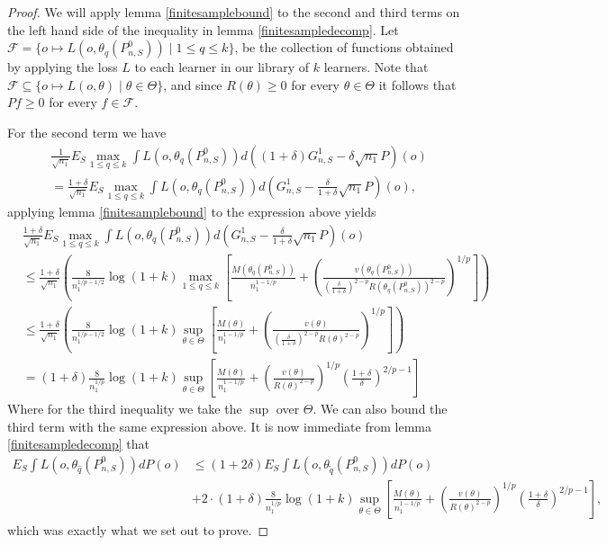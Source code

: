 \documentclass[11pt, a4paper]{article}
\theoremstyle{definition}
\theoremstyle{remark}
\newcommand{\q}{q}
\newcommand{\btheta}{\theta}
\begin{document}
\begin{proof}
    We will apply lemma \ref{finitesamplebound} to the second and third terms on the left hand side of the inequality in lemma \ref{finitesampledecomp}. Let $ \mathcal{F} = \{o \mapsto L(o, \btheta_{\q}(P_{n,S}^{0})) \mid 1 \leq \q \leq k\}$, be the collection of functions obtained by applying the loss $ L $ to each learner in our library of $ k $ learners. Note that $ \mathcal{F} \subseteq \{o \mapsto L(o, \btheta) \mid \btheta \in \Theta\} $, and since $ R(\btheta) \geq 0 $ for every $ \btheta \in \Theta $ it follows that $ Pf \geq 0 $ for every $ f \in \mathcal{F} $. 
   
For the second term we have 
\begin{align*}
&\frac{1}{\sqrt{n_1} } E_{S} \max_{1 \leq \q \leq k} \int L(o, \btheta_{\q}(P_{n, S}^{0})) d ((1 + \delta) G_{n,S}^{1} - \delta \sqrt{n_1} P)(o)\\
&= 
\frac{1 + \delta}{\sqrt{n_1} } E_{S} \max_{1 \leq \q \leq k} \int L(o, \btheta_{\q}(P_{n, S}^{0})) d (G_{n,S}^{1} - \frac{\delta }{1 + \delta} \sqrt{n_1} P)(o),
\end{align*}
applying lemma \ref{finitesamplebound} to the expression above yields 
\begin{align*}
&\frac{1 + \delta}{\sqrt{n_1} } E_{S} \max_{1 \leq \q \leq k} \int L(o, \btheta_{\q}(P_{n, S}^{0})) d (G_{n,S}^{1} - \frac{\delta }{1 + \delta} \sqrt{n_1} P)(o) \\
&\leq  \frac{1 + \delta}{\sqrt{n_1}}\left( \frac{8}{n_1^{1/p-1/2}} \log(1 + k) \max_{1 \leq \q \leq k} \left[ \frac{M(\btheta_{\q}(P_{n,S}^{0}))}{n_1^{1-1/p}} + \left( \frac{v(\btheta_{ \q}(P_{n,S}^0) )}{( \frac{\delta}{1 + \delta} )^{2-p} R(\btheta_{\q}(P_{n,S}^{0}))^{2-p}} \right)^{1/p} \right] \right)\\
&\leq  \frac{1 + \delta}{\sqrt{n_1}}\left( \frac{8}{n_1^{1/p-1/2}} \log(1 + k) \sup_{\btheta \in \Theta} \left[ \frac{M(\btheta)}{n_1^{1-1/p}} + \left( \frac{v(\btheta)}{( \frac{\delta}{1 + \delta} )^{2-p} R(\btheta)^{2-p}} \right)^{1/p} \right] \right)\\
&= (1 + \delta) \frac{8}{n_1^{1/p}} \log(1 + k) \sup_{\btheta \in \Theta} \left[ \frac{M(\btheta)}{n_1^{1-1/p}} + \left( \frac{v(\btheta)}{R(\btheta)^{2-p}} \right)^{1/p}\left( \frac{1 + \delta}{\delta}  \right)^{2/p-1} \right]  
\end{align*}
Where for the third inequality we take the $ \sup $ over $ \Theta $. We can also bound the third term with the same expression above. It is now immediate from lemma \ref{finitesampledecomp} that 
\begin{align*}
    E_{S} \int L(o, \btheta_{ \hat{\q} }(P_{n, S}^{0})) d P(o) &\leq (1 + 2 \delta) E_{S} \int L(o, \btheta_{ \tilde{\q} }(P_{n, S}^{0})) d P(o) \\
                                                               &+ 2 \cdot (1 + \delta) \frac{8}{n_1^{1/p}} \log(1 + k) \sup_{\btheta \in \Theta} \left[ \frac{M(\btheta)}{n_1^{1-1/p}} + \left( \frac{v(\btheta)}{R(\btheta)^{2-p}} \right)^{1/p}\left( \frac{1 + \delta}{\delta}  \right)^{2/p-1} \right],
\end{align*}
which was exactly what we set out to prove. 
\end{proof}
\end{document}
